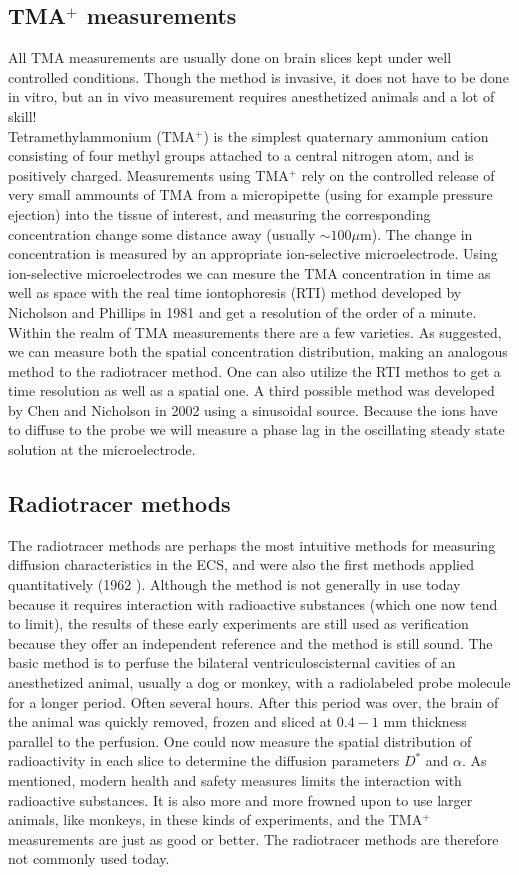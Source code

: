 \documentclass[a4paper,english, 12pt, twoside]{article}
\begin{document}
\subsection{TMA$^+$ measurements}
All TMA measurements are usually done on brain slices kept under well controlled conditions. 
Though the method is invasive, it does not have to be done in vitro, but an in vivo measurement requires anesthetized animals and a lot of skill!\\
Tetramethylammonium (TMA$^+$) is the simplest quaternary ammonium cation consisting of four methyl groups attached to a central nitrogen atom, and is positively charged. 
Measurements using TMA$^+$ rely on the controlled release of very small ammounts of TMA from a micropipette (using for example pressure ejection) into the tissue of interest, and measuring the corresponding concentration change some distance away (usually $\sim100\mu$m). 
The change in concentration is measured by an appropriate ion-selective microelectrode. 
Using ion-selective microelectrodes we can mesure the TMA concentration in time as well as space with the real time iontophoresis (RTI) method developed by Nicholson and Phillips in 1981 \cite{} and get a resolution of the order of a minute.\\
Within the realm of TMA measurements there are a few varieties. 
As suggested, we can measure both the spatial concentration distribution, making an analogous method to the radiotracer method. 
One can also utilize the RTI methos to get a time resolution as well as a spatial one. 
A third possible method was developed by Chen and Nicholson in 2002 \cite{chen2002measurement} using a sinusoidal source. 
Because the ions have to diffuse to the probe we will measure a phase lag in the oscillating steady state solution at the microelectrode. 

\subsection{Radiotracer methods}
The radiotracer methods are perhaps the most intuitive methods for measuring diffusion characteristics in the ECS, and were also the first methods applied quantitatively (1962 \cite{}). 
Although the method is not generally in use today because it requires interaction with radioactive substances (which one now tend to limit), the results of these early experiments are still used as verification because they offer an independent reference and the method is still sound. 
The basic method is to perfuse the bilateral ventriculoscisternal cavities of an anesthetized animal, usually a dog or monkey, with a radiolabeled probe molecule for a longer period. Often several hours. 
After this period was over, the brain of the animal was quickly removed, frozen and sliced at $0.4-1$ mm thickness parallel to the perfusion. 
One could now measure the spatial distribution of radioactivity in each slice to determine the diffusion parameters $D^*$ and $\alpha$. 
As mentioned, modern health and safety measures limits the interaction with radioactive substances. 
It is also more and more frowned upon to use larger animals, like monkeys, in these kinds of experiments, and the TMA$^+$ measurements are just as good or better. 
The radiotracer methods are therefore not commonly used today.
\end{document}
